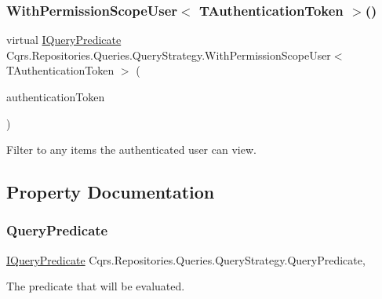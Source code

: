 \subsubsection{\texorpdfstring{With\+Permission\+Scope\+User$<$ T\+Authentication\+Token $>$()}{WithPermissionScopeUser< TAuthenticationToken >()}}
{\footnotesize\ttfamily virtual \hyperlink{interfaceCqrs_1_1Repositories_1_1Queries_1_1IQueryPredicate}{I\+Query\+Predicate} Cqrs.\+Repositories.\+Queries.\+Query\+Strategy.\+With\+Permission\+Scope\+User$<$ T\+Authentication\+Token $>$ (\begin{DoxyParamCaption}\item[{T\+Authentication\+Token}]{authentication\+Token }\end{DoxyParamCaption})\hspace{0.3cm}{\ttfamily [virtual]}}



Filter to any items the authenticated user can view. 



\subsection{Property Documentation}
\mbox{\label{classCqrs_1_1Repositories_1_1Queries_1_1QueryStrategy_a45d9ad6895a7e8c404ea64abab5242ec_a45d9ad6895a7e8c404ea64abab5242ec}} 
\subsubsection{\texorpdfstring{Query\+Predicate}{QueryPredicate}}
{\footnotesize\ttfamily \hyperlink{interfaceCqrs_1_1Repositories_1_1Queries_1_1IQueryPredicate}{I\+Query\+Predicate} Cqrs.\+Repositories.\+Queries.\+Query\+Strategy.\+Query\+Predicate\hspace{0.3cm}{\ttfamily [get]}, {}}



The predicate that will be evaluated. 

